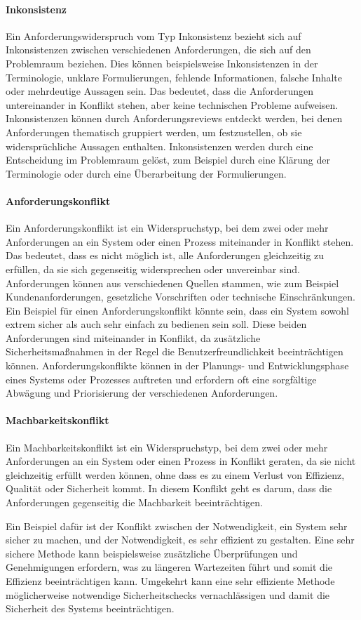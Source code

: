 \paragraph{Inkonsistenz}
Ein Anforderungswiderspruch vom Typ Inkonsistenz bezieht sich auf Inkonsistenzen zwischen verschiedenen Anforderungen,
die sich auf den Problemraum beziehen.
Dies können beispielsweise Inkonsistenzen in der Terminologie, unklare Formulierungen,
fehlende Informationen, falsche Inhalte oder mehrdeutige Aussagen sein.
Das bedeutet, dass die Anforderungen untereinander in Konflikt stehen, aber keine technischen Probleme aufweisen.
Inkonsistenzen können durch Anforderungsreviews entdeckt werden, bei denen Anforderungen thematisch gruppiert werden,
um festzustellen, ob sie widersprüchliche Aussagen enthalten.
Inkonsistenzen werden durch eine Entscheidung im Problemraum gelöst,
zum Beispiel durch eine Klärung der Terminologie oder durch eine Überarbeitung der Formulierungen.\autocite[vgl.][S.235]{Herrmann.2022}

\paragraph{Anforderungskonflikt}
Ein Anforderungskonflikt ist ein Widerspruchstyp,
bei dem zwei oder mehr Anforderungen an ein System oder einen Prozess miteinander in Konflikt stehen.
Das bedeutet, dass es nicht möglich ist, alle Anforderungen gleichzeitig zu erfüllen,
da sie sich gegenseitig widersprechen oder unvereinbar sind.
Anforderungen können aus verschiedenen Quellen stammen, wie zum Beispiel Kundenanforderungen,
gesetzliche Vorschriften oder technische Einschränkungen.
Ein Beispiel für einen Anforderungskonflikt könnte sein,
dass ein System sowohl extrem sicher als auch sehr einfach zu bedienen sein soll.
Diese beiden Anforderungen sind miteinander in Konflikt,
da zusätzliche Sicherheitsmaßnahmen in der Regel die Benutzerfreundlichkeit beeinträchtigen können.
Anforderungskonflikte können in der Planungs- und Entwicklungsphase eines Systems oder Prozesses auftreten
und erfordern oft eine sorgfältige Abwägung und Priorisierung der verschiedenen Anforderungen.\autocite[vgl.][S.235f]{Herrmann.2022}

\paragraph{Machbarkeitskonflikt}
Ein Machbarkeitskonflikt ist ein Widerspruchstyp,
bei dem zwei oder mehr Anforderungen an ein System oder einen Prozess in Konflikt geraten,
da sie nicht gleichzeitig erfüllt werden können,
ohne dass es zu einem Verlust von Effizienz, Qualität oder Sicherheit kommt.
In diesem Konflikt geht es darum, dass die Anforderungen gegenseitig die Machbarkeit beeinträchtigen.

Ein Beispiel dafür ist der Konflikt zwischen der Notwendigkeit, ein System sehr sicher zu machen,
und der Notwendigkeit, es sehr effizient zu gestalten.
Eine sehr sichere Methode kann beispielsweise zusätzliche Überprüfungen und Genehmigungen erfordern,
was zu längeren Wartezeiten führt und somit die Effizienz beeinträchtigen kann.
Umgekehrt kann eine sehr effiziente Methode möglicherweise notwendige Sicherheitschecks vernachlässigen
und damit die Sicherheit des Systems beeinträchtigen.\autocite[vgl.][S.236]{Herrmann.2022}